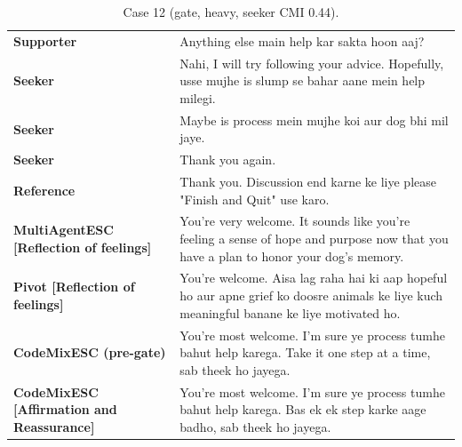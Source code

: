 \begin{table}[t]
\centering\footnotesize
\caption{Case 12 (gate, heavy, seeker CMI 0.44).}
\label{tab:case12}
\begin{tabular}{@{}p{}p{}@{}}
\toprule
\textbf{Supporter} & Anything else main help kar sakta hoon aaj? \\
\textbf{Seeker} & Nahi, I will try following your advice. Hopefully, usse mujhe is slump se bahar aane mein help milegi. \\
\textbf{Seeker} & Maybe is process mein mujhe koi aur dog bhi mil jaye. \\
\textbf{Seeker} & Thank you again. \\
\textbf{Reference} & Thank you. Discussion end karne ke liye please "Finish and Quit" use karo. \\
\textbf{MultiAgentESC [Reflection of feelings]} & You're very welcome. It sounds like you're feeling a sense of hope and purpose now that you have a plan to honor your dog's memory. \\
\textbf{Pivot [Reflection of feelings]} & You're welcome. Aisa lag raha hai ki aap hopeful ho aur apne grief ko doosre animals ke liye kuch meaningful banane ke liye motivated ho. \\
\textbf{CodeMixESC (pre-gate)} & You're most welcome. I'm sure ye process tumhe bahut help karega. Take it one step at a time, sab theek ho jayega. \\
\textbf{CodeMixESC [Affirmation and Reassurance]} & You're most welcome. I'm sure ye process tumhe bahut help karega. Bas ek ek step karke aage badho, sab theek ho jayega. \\
\bottomrule
\end{tabular}
\end{table}

